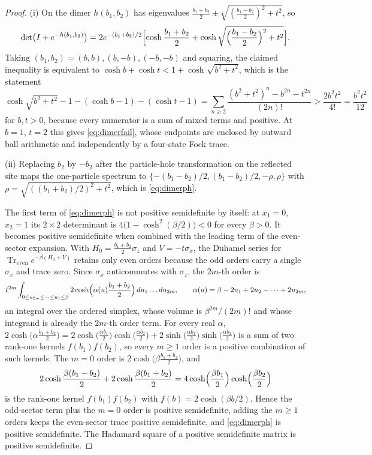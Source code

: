 \documentclass[11pt]{article}
\theoremstyle{definition}
\theoremstyle{remark}
\DeclareMathOperator{\Tr}{Tr}
\begin{document}
\begin{proof}
(i) On the dimer $h(b_1,b_2)$ has eigenvalues
$\tfrac{b_1+b_2}{2}\pm\sqrt{(\tfrac{b_1-b_2}{2})^2+t^2}$, so
\[
\det\bigl(I+e^{-h(b_1,b_2)}\bigr)
=2e^{-(b_1+b_2)/2}\Bigl[\cosh\frac{b_1+b_2}{2}
+\cosh\sqrt{\Bigl(\frac{b_1-b_2}{2}\Bigr)^2+t^2}\Bigr].
\]
Taking $(b_1,b_2)=(b,b),(b,-b),(-b,-b)$ and squaring, the claimed inequality is
equivalent to
$\cosh b+\cosh t<1+\cosh\sqrt{b^2+t^2}$, which is the statement
\[
\cosh\sqrt{b^2+t^2}-1-(\cosh b-1)-(\cosh t-1)
=\sum_{n\ge2}\frac{(b^2+t^2)^n-b^{2n}-t^{2n}}{(2n)!}
>\frac{2b^2t^2}{4!}=\frac{b^2t^2}{12}
\]
for $b,t>0$, because every numerator is a sum of mixed terms and positive. At
$b=1$, $t=2$ this gives \eqref{eq:dimerfail}, whose endpoints are enclosed by
outward ball arithmetic and independently by a four-state Fock trace.

(ii) Replacing $b_2$ by $-b_2$ after the particle-hole transformation on the
reflected site maps the one-particle spectrum to
$\{-(b_1-b_2)/2,(b_1-b_2)/2,-\rho,\rho\}$ with
$\rho=\sqrt{((b_1+b_2)/2)^2+t^2}$, which is \eqref{eq:dimerph}.

The first term of \eqref{eq:dimerph} is not positive semidefinite by itself: at
$x_1=0$, $x_2=1$ its $2\times2$ determinant is $4\bigl(1-\cosh^2(\beta/2)\bigr)<0$ for
every $\beta>0$. It becomes positive semidefinite when combined with the leading term of the
even-sector expansion. With $H_0=\tfrac{b_1+b_2}{2}\sigma_z$ and $V=-t\sigma_x$, the
Duhamel series for $\Tr_{\mathrm{even}}e^{-\beta(H_0+V)}$ retains only even orders
because the odd orders carry a single $\sigma_x$ and trace zero. Since $\sigma_x$
anticommutes with $\sigma_z$, the $2m$-th order is
\[
t^{2m}\int_{0\le u_{2m}\le\dots\le u_1\le\beta}
2\cosh\Bigl(\alpha(u)\frac{b_1+b_2}{2}\Bigr)\,du_1\dots du_{2m},
\qquad
\alpha(u)=\beta-2u_1+2u_2-\dots+2u_{2m},
\]
an integral over the ordered simplex, whose volume is $\beta^{2m}/(2m)!$ and whose
integrand is already the $2m$-th order term. For every real $\alpha$,
$2\cosh\bigl(\alpha\tfrac{b_1+b_2}{2}\bigr)
=2\cosh\bigl(\tfrac{\alpha b_1}{2}\bigr)\cosh\bigl(\tfrac{\alpha b_2}{2}\bigr)
+2\sinh\bigl(\tfrac{\alpha b_1}{2}\bigr)\sinh\bigl(\tfrac{\alpha b_2}{2}\bigr)$
is a sum of two rank-one kernels $f(b_1)f(b_2)$, so every $m\ge1$ order is a positive
combination of such kernels. The $m=0$ order is $2\cosh\bigl(\beta\tfrac{b_1+b_2}{2}\bigr)$,
and
\[
2\cosh\frac{\beta(b_1-b_2)}{2}+2\cosh\frac{\beta(b_1+b_2)}{2}
=4\cosh\Bigl(\frac{\beta b_1}{2}\Bigr)\cosh\Bigl(\frac{\beta b_2}{2}\Bigr)
\]
is the rank-one kernel $f(b_1)f(b_2)$ with $f(b)=2\cosh(\beta b/2)$. Hence the
odd-sector term plus the $m=0$ order is positive semidefinite, adding the $m\ge1$
orders keeps the even-sector trace positive semidefinite, and \eqref{eq:dimerph} is
positive semidefinite. The Hadamard square of a positive semidefinite matrix is
positive semidefinite.


\end{proof}
\end{document}
